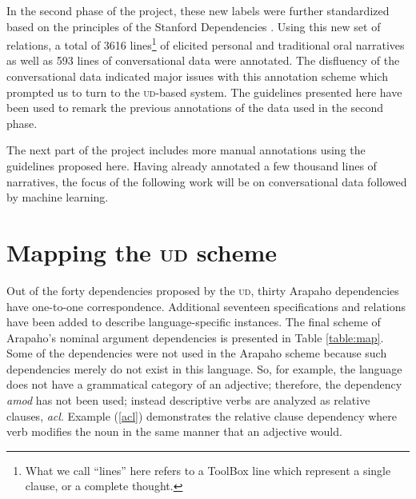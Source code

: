 \documentclass[11pt]{article}
\begin{document}
In the second phase of the project, these new labels were further standardized based on the principles of the Stanford Dependencies \cite{Marneffe2010}. Using this new set of relations, a total of 3616 lines\footnote{What we call ``lines'' here refers to a ToolBox line which represent a single clause, or a complete thought.} of elicited personal and traditional oral narratives as well as 593 lines of conversational data were annotated. The disfluency of the conversational data indicated major issues with this annotation scheme which prompted us to turn to the \textsc{ud}-based system. The guidelines presented here have been used to remark the previous annotations of the data used in the second phase.

The next part of the project includes more manual annotations using the guidelines proposed here. Having already annotated a few thousand lines of narratives, the focus of the following work will be on conversational data followed by machine learning.

\section{Mapping the \textsc{ud} scheme} \label{map}
Out of the forty dependencies proposed by the \textsc{ud}, thirty Arapaho dependencies have one-to-one correspondence. Additional seventeen specifications and relations have been added to describe language-specific instances. The final scheme of Arapaho's nominal argument dependencies is presented in Table \ref{table:map}. Some of the dependencies were not used in the Arapaho scheme because such dependencies merely do not exist in this language. So, for example, the language does not have a grammatical category of an adjective; therefore, the dependency \textit{amod} has not been used; instead descriptive verbs are analyzed as relative clauses, \textit{acl}.  Example (\ref{acl}) demonstrates the relative clause dependency where verb modifies the noun in the same manner that an adjective would.
\end{document}
